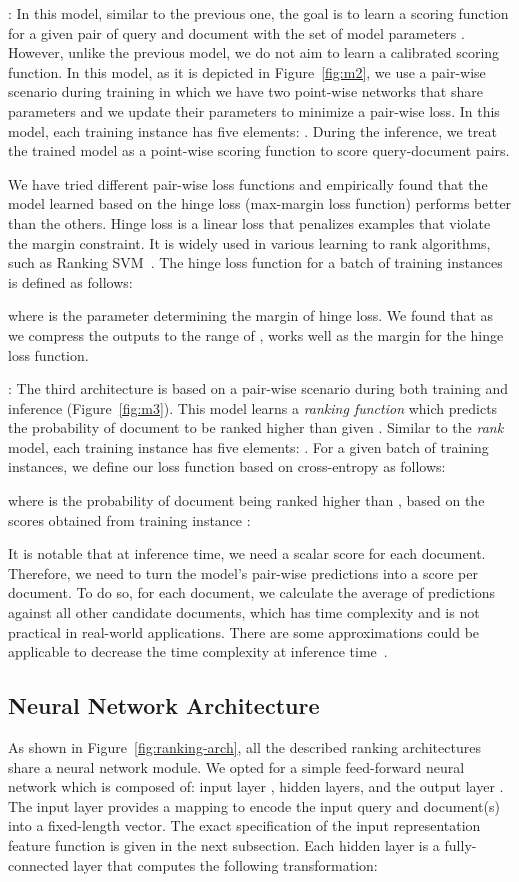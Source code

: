 \documentclass[sigconf]{acmart}
\newcommand{\Modeltwo}{Rank model\xspace}
\newcommand{\Modelthree}{Rank\-Prob model\xspace}
\newcommand{\modeltwo}{\textit{rank} model\xspace}
\newcommand{\sshrink}{\vspace{-.80ex}}
\begin{document}
\mypar{\Modeltwo}:
In this model, similar to the previous one, the goal is to learn a scoring function  for a given pair of query  and document  with the set of model parameters . 
However, unlike the previous model, we do not aim to learn a calibrated scoring function. 
In this model, as it is depicted in Figure~\ref{fig:m2}, we use a pair-wise scenario during training in which we have two point-wise networks that share parameters and we update their parameters to minimize a pair-wise loss.
In this model, each training instance has five elements: .
During the inference, we treat the trained model as a point-wise scoring function to score query-document pairs.

We have tried different pair-wise loss functions and empirically found that the model learned based on the hinge loss (max-margin loss function) performs better than the others. 
Hinge loss is a linear loss that penalizes examples that violate the margin constraint. It is widely used in various learning to rank algorithms, such as Ranking SVM~\citep{Herbrich:1999}. The hinge loss function for a batch of training instances is defined as follows:

where  is the parameter determining the margin of hinge loss. We found that as we compress the outputs to the range of ,  works well as the margin for the hinge loss function.

\mypar{\Modelthree}:
The third architecture is based on a pair-wise scenario during both training and inference (Figure~\ref{fig:m3}). This model learns a \emph{ranking function}  which predicts the probability of document  to be ranked higher than  given .
Similar to the \modeltwo, each training instance has five elements: .
For a given batch of training instances, we define our loss function based on cross-entropy as follows:

where  is the probability of document  being ranked higher than , based on the scores obtained from training instance :


It is notable that at inference time, we need a scalar score for each document. Therefore, we need to turn the model's pair-wise predictions into a score per document. To do so, for each document, we calculate the average of predictions against all other candidate documents, which has  time complexity and is not practical in real-world applications. There are some approximations could be applicable to decrease the time complexity at inference time~\citep{Wauthier:2013}.

\sshrink
\subsection{Neural Network Architecture}
As shown in Figure~\ref{fig:ranking-arch}, all the described ranking architectures share a neural network module. 
We opted for a simple feed-forward neural network which is composed of: input layer ,  hidden layers, and the output layer . The input layer  provides a mapping  to encode the input query and document(s) into a fixed-length vector.
The exact specification of the input representation feature function  is given in the next subsection. 
Each hidden layer  is a fully-connected layer that computes the following transformation:
\end{document}
